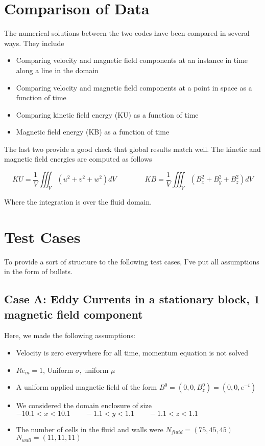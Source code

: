 \documentclass[11pt]{article}
\begin{document}
\section{Comparison of Data}

The numerical solutions between the two codes have been compared in several ways. They include

\begin{itemize}
\item Comparing velocity and magnetic field components at an instance in time along a line in the domain
\item Comparing velocity and magnetic field components at a point in space as a function of time
\item Comparing kinetic field energy (KU) as a function of time
\item Magnetic field energy (KB) as a function of time
\end{itemize}

The last two provide a good check that global results match well. The kinetic and magnetic field energies are computed as follows

\begin{equation}
	KU = \frac{1}{V} \iiint_{V} (u^2+v^2+w^2) dV
	\qquad \qquad
	KB = \frac{1}{V} \iiint_{V} (B_x^2+B_y^2+B_z^2) dV
\end{equation}

Where the integration is over the fluid domain.

\section{Test Cases}
To provide a sort of structure to the following test cases, I've put all assumptions in the form of bullets.

\subsection{Case A: Eddy Currents in a stationary block, 1 magnetic field component}
Here, we made the following assumptions:

\begin{itemize}
\item Velocity is zero everywhere for all time, momentum equation is not solved
\item $Re_m = 1$, Uniform $\sigma$, uniform $\mu$
\item A uniform applied magnetic field of the form $B^0 = (0,0,B_z^0) = (0,0,e^{-t})$
\item We considered the domain enclosure of size $-10.1 < x < 10.1 \qquad -1.1 < y < 1.1 \qquad -1.1 < z < 1.1$
\item The number of cells in the fluid and walls were $N_{fluid} = (75,45,45)$ \qquad $N_{wall} = (11,11,11)$
\end{itemize}
\end{document}
